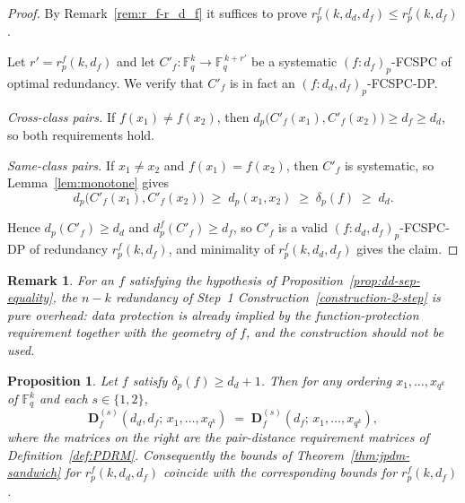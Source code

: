 \documentclass[11pt,draftclsnofoot,journal,onecolumn]{IEEEtran}
\newtheorem{proposition}{Proposition}
\newtheorem{remark}{Remark}
\begin{document}
    \begin{proof}
    By Remark~\ref{rem:r_f-r_d_f} it suffices to prove $r^f_p(k,d_d,d_f) \le r^f_p(k,d_f)$.

    Let $r' = r^f_p(k, d_f)$ and let $C'_f : \mathbb{F}_q^{k} \to \mathbb{F}_q^{\,k+r'}$ be a systematic $(f : d_f)_p$-FCSPC of optimal redundancy. We verify that $C'_f$ is in fact an $(f : d_d, d_f)_p$-FCSPC-DP.

    \emph{Cross-class pairs.} If $f(x_1) \neq f(x_2)$, then $d_p\bigl(C'_f(x_1), C'_f(x_2)\bigr) \ge d_f \ge d_d$, so both requirements hold.

    \emph{Same-class pairs.} If $x_1 \neq x_2$ and $f(x_1) = f(x_2)$, then $C'_f$ is systematic, so Lemma~\ref{lem:monotone} gives
    \[
    d_p\bigl(C'_f(x_1), C'_f(x_2)\bigr) \;\ge\; d_p(x_1,x_2) \;\ge\; \delta_p(f) \;\ge\; d_d .
    \]

    Hence $d_p(C'_f) \ge d_d$ and $d_p^f(C'_f) \ge d_f$, so $C'_f$ is a valid $(f : d_d,d_f)_p$-FCSPC-DP of redundancy $r^f_p(k,d_f)$, and minimality of $r^f_p(k,d_d,d_f)$ gives the claim.
    \end{proof}
 

    \begin{remark}
    For an $f$ satisfying the hypothesis of Proposition~\ref{prop:dd-sep-equality}, the $n-k$ redundancy of Step~1 Construction~\ref{construction-2-step} is pure overhead: data protection is already implied by the function-protection requirement together with the geometry of $f$, and the construction should not be used.
    \end{remark}


    \begin{proposition}
    \label{prop:pair-jdrm-equals-pdrm}
    Let $f$ satisfy $\delta_p(f) \ge d_d + 1$. Then for any ordering $x_1,\dots,x_{q^k}$ of $\mathbb{F}_q^{k}$ and each $s \in \{1,2\}$,
    \[
    \boldsymbol{D}^{(s)}_{f}(d_d, d_f;\, x_1,\dots,x_{q^k})
    \;=\;
    \boldsymbol{D}^{(s)}_{f}(d_f;\, x_1,\dots,x_{q^k}),
    \]
    where the matrices on the right are the pair-distance requirement matrices of Definition~\ref{def:PDRM}. Consequently the bounds of Theorem~\ref{thm:jpdm-sandwich} for $r^f_p(k,d_d,d_f)$ coincide with the corresponding bounds for $r^f_p(k,d_f)$.
    \end{proposition}
\end{document}
